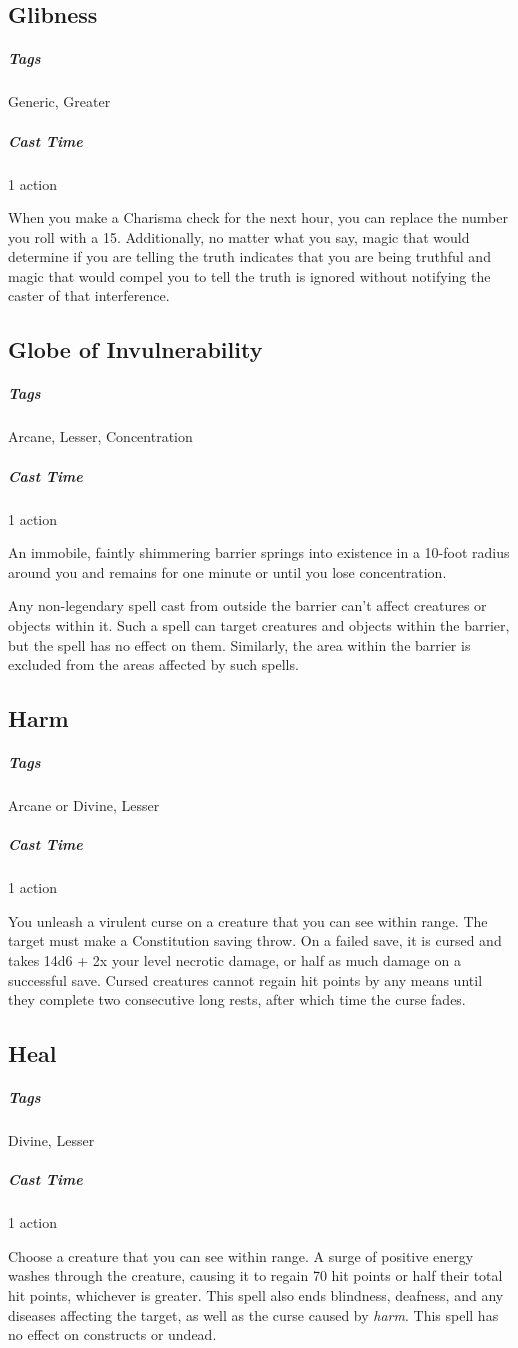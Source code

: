 \subsection{Glibness}
\subparagraph*{Tags} Generic, Greater
\subparagraph*{Cast Time} 1 action

When you make a Charisma check for the next hour, you can replace the number you roll with a 15. Additionally, no matter what you say, magic that would determine if you are telling the truth indicates that you are being truthful and magic that would compel you to tell the truth is ignored without notifying the caster of that interference.

\subsection{Globe of Invulnerability}
\subparagraph*{Tags} Arcane, Lesser, Concentration
\subparagraph*{Cast Time} 1 action

An immobile, faintly shimmering barrier springs into existence in a 10-foot radius around you and remains for one minute or until you lose concentration.

Any non-legendary spell cast from outside the barrier can’t affect creatures or objects within it. Such a spell can target creatures and objects within the barrier, but the spell has no effect on them. Similarly, the area within the barrier is excluded from the areas affected by such spells.

\subsection{Harm}
\subparagraph*{Tags} Arcane or Divine, Lesser
\subparagraph*{Cast Time} 1 action

You unleash a virulent curse on a creature that you can see within range. The target must make a Constitution saving throw. On a failed save, it is cursed and takes 14d6 + 2x your level necrotic damage, or half as much damage on a successful save. Cursed creatures cannot regain hit points by any means until they complete two consecutive long rests, after which time the curse fades.

\subsection{Heal}
\subparagraph*{Tags} Divine, Lesser
\subparagraph*{Cast Time} 1 action

Choose a creature that you can see within range. A surge of positive energy washes through the creature, causing it to regain 70 hit points or half their total hit points, whichever is greater. This spell also ends blindness, deafness, and any diseases affecting the target, as well as the curse caused by \textit{harm}. This spell has no effect on constructs or undead.

